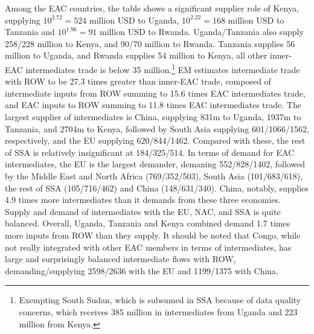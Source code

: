 \documentclass[a4paper]{article}
\begin{document}
Among the EAC countries, the table shows a significant supplier role of Kenya, supplying $10^{2.72} = 524$ million USD to Uganda, $10^{2.22} = 168$ million USD to Tanzania and  $10^{1.96} = 91$ million USD to Rwanda. Uganda/Tanzania also supply 258/228 million to Kenya, and 90/70 million to Rwanda. Tanzania supplies 56 million to Uganda, and Rwanda supplies 54 million to Kenya, all other inner-EAC intermediates trade is below 35 million.\footnote{Exempting South Sudan, which is subsumed in SSA because of data quality concerns, which receives 385 million in intermediates from Uganda and 223 million from Kenya.} EM estimates intermediate trade with ROW to be 27.3 times greater than inner-EAC trade, composed of intermediate inputs from ROW summing to 15.6 times EAC intermediates trade, and EAC inputs to ROW summing to 11.8 times EAC intermediates trade. The largest supplier of intermediates is China, supplying 831m to Uganda, 1937m to Tanzania, and 2704m to Kenya, followed by South Asia supplying 601/1066/1562, respectively, and the EU supplying 620/844/1462. Compared with these, the rest of SSA is relatively insignificant at 184/325/514. In terms of demand for EAC intermediates, the EU is the largest demander, demaning 552/828/1402, followed by the Middle East and North Africa (769/352/503), South Asia (101/683/618), the rest of SSA (105/716/462) and China (148/631/340). China, notably, supplies 4.9 times more intermediates than it demands from these three economies. Supply and demand of intermediates with the EU, NAC, and SSA is quite balanced. Overall, Uganda, Tanzania and Kenya combined demand 1.7 times more inputs from ROW than they supply. It should be noted that Congo, while not really integrated with other EAC members in terms of intermediates, has large and surprisingly balanced intermediate flows with ROW, demanding/supplying 2598/2636 with the EU and 1199/1375 with China. 

\end{document}
